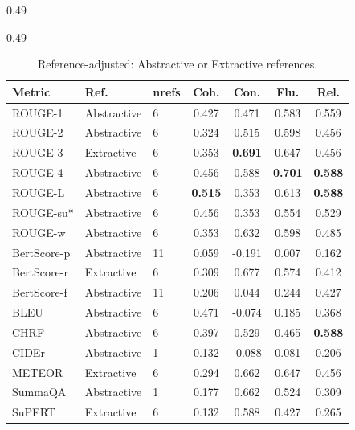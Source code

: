 \begin{table}[h!]
\begin{subtable}[t]{0.49\textwidth}
\label{tab:traditional_metrics-refbased}
\end{subtable}%
\hfill
\begin{subtable}[t]{0.49\textwidth}
\centering
\begin{tabular}{lllcccc}
\toprule
\textbf{Metric} & \textbf{Ref.} & \textbf{nrefs}
  & \textbf{Coh.} & \textbf{Con.} & \textbf{Flu.} & \textbf{Rel.} \\
\midrule
\rowcolor{refadj}
ROUGE-1 & Abstractive & 6 & 0.427 & 0.471 & 0.583 & 0.559 \\
\rowcolor{refadj}
ROUGE-2 & Abstractive & 6 & 0.324 & 0.515 & 0.598 & 0.456 \\
\rowcolor{refadj}
ROUGE-3 & Extractive & 6 & 0.353 & \textbf{0.691} & 0.647 & 0.456 \\
\rowcolor{refadj}
ROUGE-4 & Abstractive & 6 & 0.456 & 0.588 & \textbf{0.701} & \textbf{0.588} \\
\rowcolor{refadj}
ROUGE-L & Abstractive & 6 & \textbf{0.515} & 0.353 & 0.613 & \textbf{0.588} \\
\rowcolor{refadj}
ROUGE-su* & Abstractive & 6 & 0.456 & 0.353 & 0.554 & 0.529 \\
\rowcolor{refadj}
ROUGE-w & Abstractive & 6 & 0.353 & 0.632 & 0.598 & 0.485 \\
\rowcolor{refadj}
BertScore-p & Abstractive & 11 & 0.059 & -0.191 & 0.007 & 0.162 \\
\rowcolor{refadj}
BertScore-r & Extractive & 6 & 0.309 & 0.677 & 0.574 & 0.412 \\
\rowcolor{refadj}
BertScore-f & Abstractive & 11 & 0.206 & 0.044 & 0.244 & 0.427 \\
\rowcolor{refadj}
BLEU & Abstractive & 6 & 0.471 & -0.074 & 0.185 & 0.368 \\
\rowcolor{refadj}
CHRF & Abstractive & 6 & 0.397 & 0.529 & 0.465 & \textbf{0.588} \\
\rowcolor{refadj}
CIDEr & Abstractive & 1 & 0.132 & -0.088 & 0.081 & 0.206 \\
\rowcolor{refadj}
METEOR & Extractive & 6 & 0.294 & 0.662 & 0.647 & 0.456 \\
\rowcolor{refadj}
SummaQA & Abstractive & 1 & 0.177 & 0.662 & 0.524 & 0.309 \\
\rowcolor{refadj}
SuPERT & Extractive & 6 & 0.132 & 0.588 & 0.427 & 0.265 \\
\bottomrule
\end{tabular}
\caption{Reference-adjusted: Abstractive or Extractive references.}
\label{tab:traditional_metrics-refadj}
\end{subtable}


\end{table}
